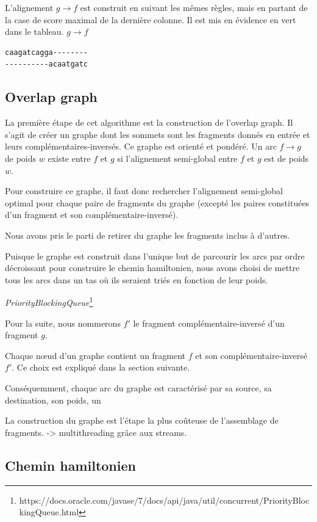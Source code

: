 \documentclass{article}
\begin{document}
L'alignement $g \to f$ est construit en suivant les mêmes règles, mais en partant de la case de score maximal de la dernière colonne. Il est mis en évidence en vert dans le tableau.
$g \to f$
\begin{verbatim}
caagatcagga--------
----------acaatgatc
\end{verbatim}


\subsection{Overlap graph}

La première étape de cet algorithme est la construction de l'overlap graph. Il s'agit de créer un graphe dont les sommets sont les fragments donnés en entrée et leurs complémentaires-inversés. Ce graphe est orienté et pondéré. Un arc $f\to g$ de poids $w$ existe entre $f$ et $g$ si l'alignement semi-global entre $f$ et $g$ est de poids $w$.

Pour construire ce graphe, il faut donc rechercher l'alignement semi-global optimal pour chaque paire de fragments du graphe (excepté les paires constituées d'un fragment et son complémentaire-inversé).

Nous avons pris le parti de retirer du graphe les fragments inclus à d'autres.

Puisque le graphe est construit dans l'unique but de parcourir les arcs par ordre décroissant pour construire le chemin hamiltonien, nous avons choisi de mettre tous les arcs dans un tas où ils seraient triés en fonction de leur poids.

\textit{PriorityBlockingQueue}\footnote{https://docs.oracle.com/javase/7/docs/api/java/util/concurrent/PriorityBlockingQueue.html}

Pour la suite, nous nommerons $f'$ le fragment complémentaire-inversé d'un fragment $g$. 

Chaque nœud d'un graphe contient un fragment $f$ et son complémentaire-inversé $f'$. Ce choix est expliqué dans la section suivante.

Conséquemment, chaque arc du graphe est caractérisé par sa source, sa destination, son poids, un

La construction du graphe est l'étape la plus coûteuse de l'assemblage de fragments. -> multithreading grâce aux streams.



\subsection{Chemin hamiltonien}
\end{document}
